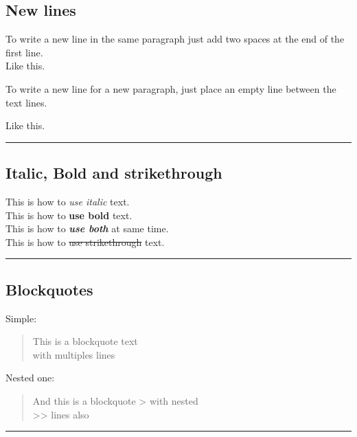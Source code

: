 \documentclass[]{article}
\begin{document}
\subsection{New lines}\label{new-lines}

To write a new line in the same paragraph just add two spaces at the end
of the first line.\\
Like this.

To write a new line for a new paragraph, just place an empty line
between the text lines.

Like this.

\begin{center}\rule{0.5\linewidth}{\linethickness}\end{center}

\subsection{Italic, Bold and
strikethrough}\label{italic-bold-and-strikethrough}

This is how to \emph{use italic} text.\\
This is how to \textbf{use bold} text.\\
This is how to \textbf{\emph{use both}} at same time.\\
This is how to \sout{use strikethrough} text.

\begin{center}\rule{0.5\linewidth}{\linethickness}\end{center}

\subsection{Blockquotes}\label{blockquotes}

Simple:

\begin{quote}
This is a blockquote text\\
with multiples lines
\end{quote}

Nested one:

\begin{quote}
And this is a blockquote \textgreater{} with nested\\
\textgreater{}\textgreater{} lines also
\end{quote}

\begin{center}\rule{0.5\linewidth}{\linethickness}\end{center}
\end{document}
